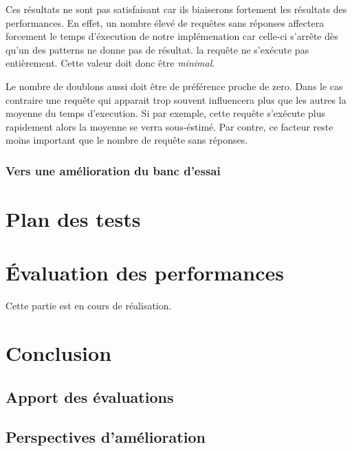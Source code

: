 \documentclass[12pt,titlepage]{article}
\begin{document}
Ces résultats ne sont pas satisfaisant car ils biaiserons fortement les résultats des performances. En effet, un nombre élevé de requêtes sans réponses affectera forcement le temps d'éxecution de notre implémenation car celle-ci s'arrête dès qu'un des patterns ne donne pas de résultat. la requête ne s'exécute pas entièrement. Cette valeur doit donc être \textit{minimal}.

Le nombre de doublons aussi doit être de préférence proche de zero. Dans le cas contraire une requête qui apparait trop souvent influencera plus que les autres la moyenne du temps d'execution. Si par exemple, cette requête s'exécute plus rapidement alors la moyenne se verra sous-éstimé. Par contre, ce facteur reste moins important que le nombre de requête sans réponses.

\subsubsection{Vers une amélioration du banc d'essai}


\section{Plan des tests}

\section{Évaluation des performances}

Cette partie est en cours de réalisation.

\section{Conclusion}

\subsection{Apport des évaluations}

\subsection{Perspectives d'amélioration}
\end{document}

